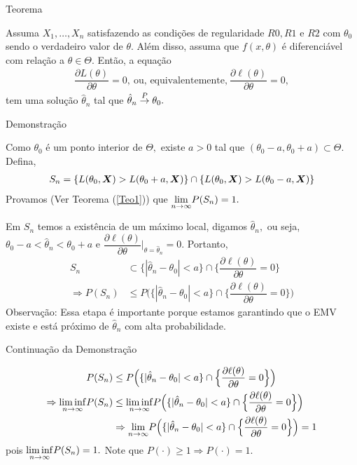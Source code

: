 \documentclass[12pt]{beamer}
\begin{document}
\begin{frame}{Teorema}
\begin{Teorema}\label{Teo3}
\justifying
Assuma $X_{1},\ldots,X_{n}$ satisfazendo as condições de regularidade $R0, R1$ e $R2$ com $\theta_{0}$ sendo o verdadeiro valor de $\theta.$ Além disso, assuma que $f(x,\theta)$ é diferenciável com relação a $\theta\in\Theta.$ Então, a equação 
\begin{align*}
    \dfrac{\partial L(\theta)}{\partial\theta}=0,~\text{ou, equivalentemente,}~\dfrac{\partial\ell(\theta)}{\partial\theta}=0,
\end{align*}
tem uma solução $\hat{\theta}_{n}$ tal que $\hat{\theta}_{n}\overset{P}{\rightarrow} \theta_{0}.$
\end{Teorema}
\end{frame}

\begin{frame}{Demonstração}
\begin{block}{}
\justifying
Como $\theta_{0}$ é um ponto interior de $\Theta,$ existe $a>0$ tal que $(\theta_{0}-a,\theta_{0}+a)\subset\Theta.$ Defina, 
\begin{align*}
    S_{n}=\{L(\theta_{0},\boldsymbol{X})>L(\theta_{0}+a,\boldsymbol{X})\}\cap \{L(\theta_{0},\boldsymbol{X})>L(\theta_{0}-a,\boldsymbol{X})\}
\end{align*}
Provamos (Ver Teorema (\ref{Teo1})) que ${\displaystyle \lim_{n\to\infty}} P(S_{n})=1.$
\end{block}
\begin{block}{}
\justifying
Em $S_{n}$ temos a existência de um máximo local, digamos $\hat{\theta}_{n},$ ou seja, $\theta_{0}-a<\hat{\theta}_{n}<\theta_{0}+a$ e $\dfrac{\partial \ell(\theta)}{\partial\theta}|_{\theta=\hat{\theta}_{n}}=0.$ Portanto, 
\begin{align*}
    S_{n}&\subset \{|\hat{\theta}_{n}-\theta_{0}|<a\}\cap\Big\{\dfrac{\partial \ell(\theta)}{\partial\theta}=0\Big\}\\
    \Rightarrow P(S_{n})&\leq P\Big(\{|\hat{\theta}_{n}-\theta_{0}|<a\}\cap\Big\{\dfrac{\partial \ell(\theta)}{\partial\theta}=0\Big\}\Big)
\end{align*}
Observação: Essa etapa é importante porque estamos garantindo que o EMV existe e está próximo de 
$\hat{\theta}_{n}$ com alta probabilidade.
\end{block}
\end{frame}

\begin{frame}{Continuação da Demonstração}
\begin{block}{}
\begin{align*}
P(S_{n})&\leq P\Big(\{|\hat{\theta}_{n}-\theta_{0}|<a\}\cap\Big\{\dfrac{\partial \ell(\theta)}{\partial\theta}=0\Big\}\Big)\\
\Rightarrow {\displaystyle \liminf_{n\to\infty}} P(S_{n})&\leq {\displaystyle \liminf_{n\to\infty}} P\Big(\{|\hat{\theta}_{n}-\theta_{0}|<a\}\cap\Big\{\dfrac{\partial \ell(\theta)}{\partial\theta}=0\Big\}\Big)\\
&\Rightarrow {\displaystyle \lim_{n\to\infty}} P\Big(\{|\hat{\theta}_{n}-\theta_{0}|<a\}\cap\Big\{\dfrac{\partial \ell(\theta)}{\partial\theta}=0\Big\}\Big)=1
\end{align*}
pois ${\displaystyle \liminf_{n\to\infty}} P(S_{n})=1.$ Note que $P(\cdot)\geq 1\Rightarrow P(\cdot)=1.$
\end{block}
\end{frame}
\end{document}
